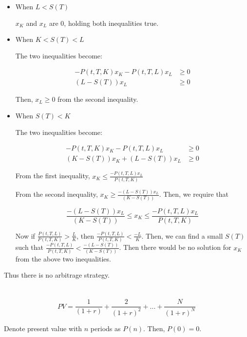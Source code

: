 \documentclass[11pt]{scrartcl}
\begin{document}
\begin{itemize}
\item When $L < S(T)$

$x_K$ and $x_L$ are 0, holding both inequalities true.

\item When $K < S(T) < L$

The two inequalities become:

\begin{align*}
-P(t, T, K)x_K - P(t, T, L)x_L &\geq 0 \\
(L-S(T))x_L &\geq 0
\end{align*}

Then, $x_L \geq 0$ from the second inequality.

\item When $S(T) < K$

The two inequalities become:

\begin{align*}
-P(t, T, K)x_K - P(t, T, L)x_L &\geq 0 \\
(K-S(T))x_K + (L-S(T))x_L &\geq 0
\end{align*}

From the first inequality, $x_K \leq \frac{-P(t, T, L)x_L}{P(t, T, K)}$

From the second inequality, $x_K \geq \frac{-(L-S(T))x_L}{(K-S(T))}$. Then, we require that

\[\frac{-(L-S(T))x_L}{(K-S(T))} \leq x_K \leq \frac{-P(t, T, L)x_L}{P(t, T, K)}\]

Now if $\frac{P(t, T, L)}{P(t, T, K)} > \frac{L}{K}$, then $\frac{-P(t, T, L)}{P(t, T, K)} < \frac{-L}{K}$. Then, we can find a small $S(T)$ such that $\frac{-P(t, T, L)}{P(t, T, K)} < \frac{-(L-S(T))}{(K-S(T))}$. Then there would be no solution for $x_K$ from the above two inequalities.
\end{itemize}

Thus there is no arbitrage strategy.

\section{}

\subsection{}

\[PV = \frac{1}{(1+r)} + \frac{2}{(1+r)^2} + ... + \frac{N}{(1+r)^N}\]

Denote present value with $n$ periods as $P(n)$. Then, $P(0) = 0$.
\end{document}
